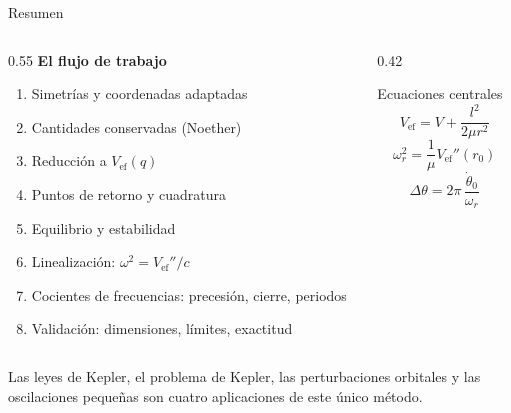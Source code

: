 \documentclass[11pt]{beamer}
\newcommand{\Vef}{V_{\mathrm{ef}}}
\begin{document}
\begin{frame}{Resumen}
\small
\begin{columns}[T]
\begin{column}{0.55\textwidth}
\textbf{El flujo de trabajo}
\footnotesize
\begin{enumerate}\setlength{\itemsep}{0pt}
  \item Simetrías y coordenadas adaptadas
  \item Cantidades conservadas (Noether)
  \item Reducción a $\Vef(q)$
  \item Puntos de retorno y cuadratura
  \item Equilibrio y estabilidad
  \item Linealización: $\omega^2=\Vef''/c$
  \item Cocientes de frecuencias: precesión, cierre, periodos
  \item Validación: dimensiones, límites, exactitud
\end{enumerate}
\end{column}
\begin{column}{0.42\textwidth}
\begin{block}{Ecuaciones centrales}
\footnotesize
\[\Vef=V+\frac{l^2}{2\mu r^2}\]
\[\omega_r^2=\frac{1}{\mu}\Vef''(r_0)\]
\[\Delta\theta=2\pi\,\frac{\dot\theta_0}{\omega_r}\]
\end{block}
\end{column}
\end{columns}
\vspace{0.3em}
Las leyes de Kepler, el problema de Kepler, las perturbaciones orbitales y las oscilaciones pequeñas son cuatro aplicaciones de este único método.
\end{frame}
\end{document}
